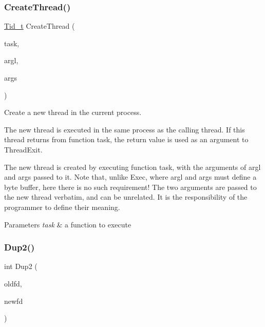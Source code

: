 \subsubsection{\texorpdfstring{Create\+Thread()}{CreateThread()}}
{\footnotesize\ttfamily \hyperlink{group__syscalls_gaf67ad1c55e6b2a79bf8a99106380ce01}{Tid\+\_\+t} Create\+Thread (\begin{DoxyParamCaption}\item[{\hyperlink{group__syscalls_gaec3f2f835e105271fbbc00272c0ba984}{Task}}]{task,  }\item[{int}]{argl,  }\item[{void $\ast$}]{args }\end{DoxyParamCaption})}



Create a new thread in the current process. 

The new thread is executed in the same process as the calling thread. If this thread returns from function task, the return value is used as an argument to {\ttfamily Thread\+Exit}.

The new thread is created by executing function {\ttfamily task}, with the arguments of {\ttfamily argl} and {\ttfamily args} passed to it. Note that, unlike {\ttfamily Exec}, where argl and args must define a byte buffer, here there is no such requirement! The two arguments are passed to the new thread verbatim, and can be unrelated. It is the responsibility of the programmer to define their meaning.


\begin{DoxyParams}{Parameters}
{\em task} & a function to execute \\
\hline
\end{DoxyParams}
\mbox{\label{group__syscalls_gacc048c60209e2dfb4b5cfc1c3f21aa88}} 
\subsubsection{\texorpdfstring{Dup2()}{Dup2()}}
{\footnotesize\ttfamily int Dup2 (\begin{DoxyParamCaption}\item[{\hyperlink{group__syscalls_ga5097222c5f0da97d92d4712359abc38f}{Fid\+\_\+t}}]{oldfd,  }\item[{\hyperlink{group__syscalls_ga5097222c5f0da97d92d4712359abc38f}{Fid\+\_\+t}}]{newfd }\end{DoxyParamCaption})}



